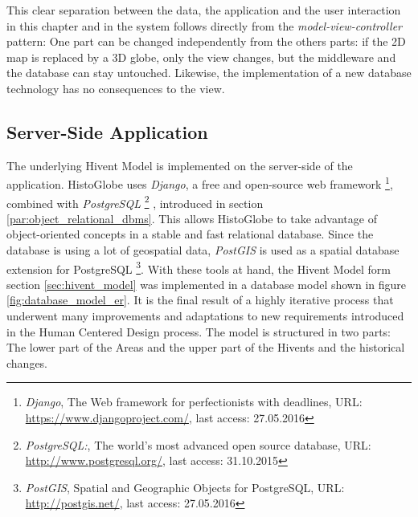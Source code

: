 This clear separation between the data, the application and the user interaction in this chapter and in the system follows directly from the \emph{model-view-controller} pattern: One part can be changed independently from the others parts: if the 2D map is replaced by a 3D globe, only the view changes, but the middleware and the database can stay untouched. Likewise, the implementation of a new database technology has no consequences to the view.


\subsection{Server-Side Application} %
\label{sub:server_side_application}

The underlying Hivent Model is implemented on the server-side of the application. HistoGlobe uses \emph{Django}, a free and open-source web framework
\footnote{
  \emph{Django},
  The Web framework for perfectionists with deadlines,
  URL: \url{https://www.djangoproject.com/},
  last access: 27.05.2016
},
combined with \emph{PostgreSQL}
\footnote{
  \emph{PostgreSQL:},
  The world's most advanced open source database,
  URL: \url{http://www.postgresql.org/},
  last access: 31.10.2015
}
, introduced in section \ref{par:object_relational_dbms}. This allows HistoGlobe to take advantage of object-oriented concepts in a stable and fast relational database. Since the database is using a lot of geospatial data, \emph{PostGIS} is used as a spatial database extension for PostgreSQL
\footnote{
  \emph{PostGIS},
  Spatial and Geographic Objects for PostgreSQL,
  URL: \url{http://postgis.net/},
  last access: 27.05.2016
}. With these tools at hand, the Hivent Model form section \ref{sec:hivent_model}  was implemented in a database model shown in figure \ref{fig:database_model_er}. It is the final result of a highly iterative process that underwent many improvements and adaptations to new requirements introduced in the Human Centered Design process. The model is structured in two parts: The lower part of the Areas and the upper part of the Hivents and the historical changes.

